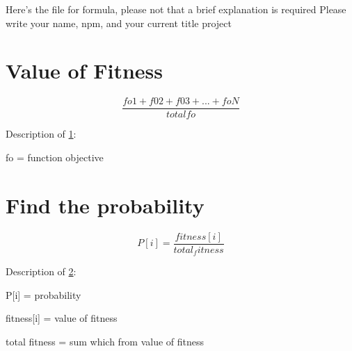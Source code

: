 Here's the file for formula, please not that a brief explanation is required
Please write your name, npm, and your current title project

\section{Value of Fitness} 
    \label{fitness}
    \begin{equation}
        \frac{fo1 + f02 + f03 + ... + foN}{total fo}
    \end{equation}
    \par Description of \ref{fitness}:
    \par fo = function objective

\section{Find the probability} 
    \label{ptobabilty}
    \begin{equation}
        P[i] = \frac{fitness[i]}{total_fitness}
    \end{equation}
    \par Description of \ref{ptobabilty}:
    \par P[i] = probability
    \par fitness[i] = value of fitness
    \par total fitness = sum which from value of fitness 